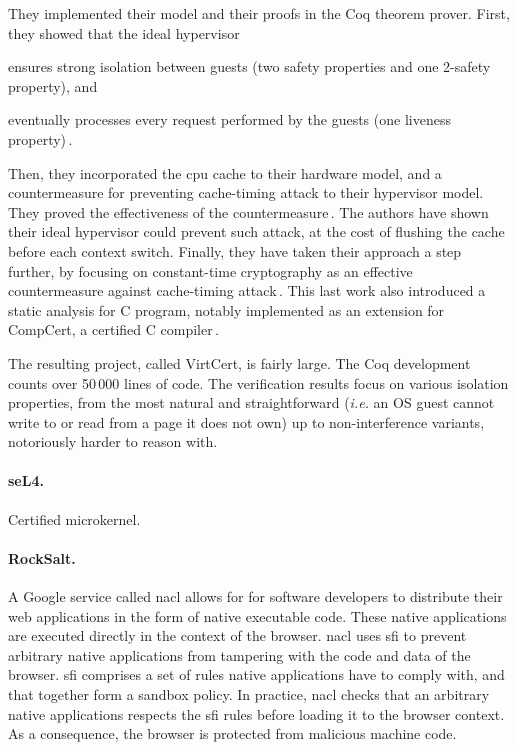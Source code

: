 They implemented their model and their proofs in the Coq theorem prover.
%
First, they showed that the ideal hypervisor
%
\begin{inparaenum}[(1)]
\item ensures strong isolation between guests (two safety properties and one
  2-safety property), and
%
\item eventually processes every request performed by the guests (one liveness
  property)\,\cite{barthe2011virtcert1}.
\end{inparaenum}
%
Then, they incorporated the \ac{cpu} cache to their hardware model, and a
countermeasure for preventing cache-timing attack to their hypervisor model.
%
They proved the effectiveness of the countermeasure\,\cite{barthe2012virtcert2}.
%
The authors have shown their ideal hypervisor could prevent such attack, at the
cost of flushing the cache before each context switch.
%
Finally, they have taken their approach a step further, by focusing on
constant-time cryptography as an effective countermeasure against cache-timing
attack\,\cite{barthe2014virtcert3}.
%
This last work also introduced a static analysis for C program, notably
implemented as an extension for CompCert, a certified C
compiler\,\cite{leroy2012compcert}.
%

The resulting project, called VirtCert, is fairly large.
%
The Coq development counts over 50\,000 lines of code.
%
The verification results focus on various isolation properties, from the most
natural and straightforward (\emph{i.e.} an OS guest cannot write to or read
from a page it does not own) up to non-interference variants, notoriously harder
to reason with.  

\paragraph{seL4.}
%
Certified microkernel.
%

\paragraph{RockSalt.}
%
A Google service called \ac{nacl} allows for for software
developers to distribute their web applications in the form of native executable
code.
%
These native applications are executed directly in the context of the browser.
%
\ac{nacl} uses \ac{sfi} to prevent arbitrary native applications from tampering
with the code and data of the browser.
%
\ac{sfi} comprises a set of rules native applications have to comply with, and
that together form a sandbox policy.
%
In practice, \ac{nacl} checks that an arbitrary native applications respects
the \ac{sfi} rules before loading it to the browser context.
%
As a consequence, the browser is protected from malicious machine code.

